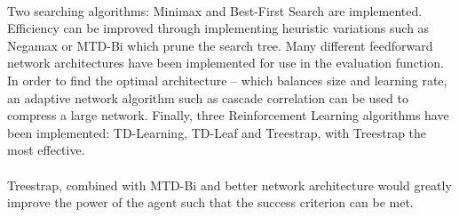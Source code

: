 \documentclass[a4paper]{article}
\begin{document}
\paragraph{} Two searching algorithms: Minimax and Best-First Search are implemented. Efficiency can be improved through implementing heuristic variations such as Negamax or MTD-Bi which prune the search tree. Many different feedforward network architectures have been implemented for use in the evaluation function. In order to find the optimal architecture -- which balances size and learning rate, an adaptive network algorithm such as cascade correlation can be used to compress a large network. Finally, three Reinforcement Learning algorithms have been implemented: TD-Learning, TD-Leaf and Treestrap, with Treestrap the most effective.

\paragraph{} Treestrap, combined with MTD-Bi and better network architecture would greatly improve the power of the agent such that the success criterion can be met.
\end{document}
